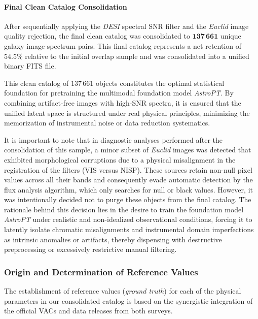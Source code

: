 \paragraph{Final Clean Catalog Consolidation}

After sequentially applying the \textit{\gls{DESI}} spectral \gls{SNR} filter and the \textit{Euclid} image quality rejection, the final clean catalog was consolidated to $\mathbf{137\,661}$ unique galaxy image-spectrum pairs. This final catalog represents a net retention of $54.5\%$ relative to the initial overlap sample and was consolidated into a unified binary FITS file.

This clean catalog of $137\,661$ objects constitutes the optimal statistical foundation for pretraining the multimodal foundation model \textit{AstroPT}. By combining artifact-free images with high-\gls{SNR} spectra, it is ensured that the unified latent space is structured under real physical principles, minimizing the memorization of instrumental noise or data reduction systematics.

It is important to note that in diagnostic analyses performed after the consolidation of this sample, a minor subset of \textit{Euclid} images was detected that exhibited morphological corruptions due to a physical misalignment in the registration of the filters (VIS versus NISP). These sources retain non-null pixel values across all their bands and consequently evade automatic detection by the flux analysis algorithm, which only searches for null or black values. However, it was intentionally decided not to purge these objects from the final catalog. The rationale behind this decision lies in the desire to train the foundation model \textit{AstroPT} under realistic and non-idealized observational conditions, forcing it to latently isolate chromatic misalignments and instrumental domain imperfections as intrinsic anomalies or artifacts, thereby dispensing with destructive preprocessing or excessively restrictive manual filtering.

\subsubsection{Origin and Determination of Reference Values}

The establishment of reference values (\textit{ground truth}) for each of the physical parameters in our consolidated catalog is based on the synergistic integration of the official \glspl{VAC} and data releases from both surveys.

